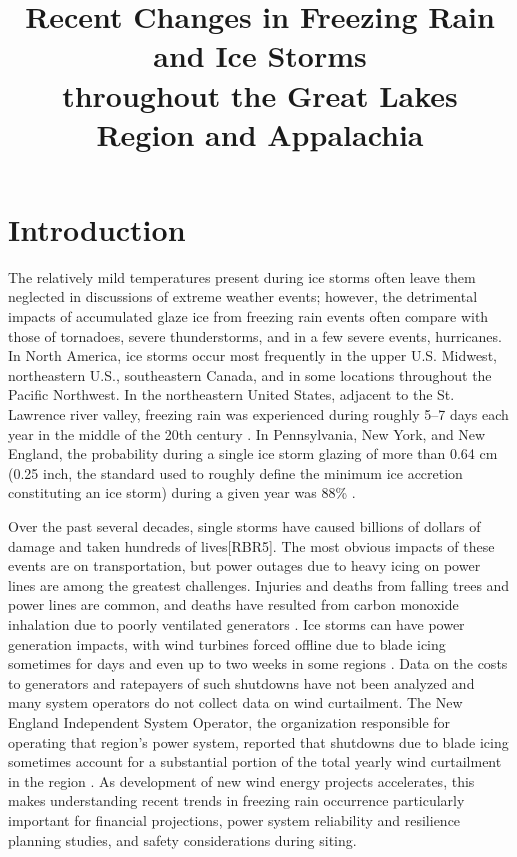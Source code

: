 \documentclass[twocol]{ametsoc}
\title{Recent Changes in Freezing Rain and Ice Storms\\ throughout the Great Lakes Region and Appalachia}
\affiliation{Department of Climate and Space Sciences and Engineering, University of Michigan, Ann Arbor, Michigan}
\begin{document}
\maketitle

%
\section{Introduction}
The relatively mild temperatures present during ice storms often leave them neglected in discussions of extreme weather events; however, the detrimental impacts of accumulated glaze ice from freezing rain events often compare with those of tornadoes, severe thunderstorms, and in a few severe events, hurricanes.  In North America, ice storms occur most frequently in the upper U.S. Midwest, northeastern U.S., southeastern Canada, and in some locations throughout the Pacific Northwest. In the northeastern United States, adjacent to the St. Lawrence river valley, freezing rain was experienced during roughly 5--7 days each year in the middle of the 20th century \citep{changnon2003temporal}. In Pennsylvania, New York, and New England, the probability during a single ice storm glazing of more than 0.64 cm (0.25 inch, the standard used to roughly define the minimum ice accretion constituting an ice storm) during a given year was 88\% \citep{nwsglossary,tattelman1973estimated}. 

Over the past several decades, single storms have caused billions of dollars of damage and taken hundreds of lives[RBR5]. The most obvious impacts of these events are on transportation, but power outages due to heavy icing on power lines are among the greatest challenges. Injuries and deaths from falling trees and power lines are common, and deaths have resulted from carbon monoxide inhalation due to poorly ventilated generators \citep{daley2000outbreak}.  Ice storms can have power generation impacts, with wind turbines forced offline due to blade icing sometimes for days and even up to two weeks in some regions \citep{davis2014forecast}. Data on the costs to generators and ratepayers of such shutdowns have not been analyzed and many system operators do not collect data on wind curtailment. The New England Independent System Operator, the organization responsible for operating that region's power system, reported that shutdowns due to blade icing sometimes account for a substantial portion of the total yearly wind curtailment in the region \citep{bird2014wind}. As development of new wind energy projects accelerates, this makes understanding recent trends in freezing rain occurrence particularly important for financial projections, power system reliability and resilience planning studies, and safety considerations during siting. 
\end{document}
